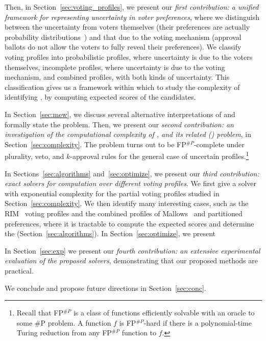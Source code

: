 Then, in Section~\ref{sec:voting_profiles}, we present our \emph{first contribution: a unified framework for representing uncertainty in voter preferences}, where we distinguish between the uncertainty from voters themselves (\eg their preferences are actually probability distributions~\cite{marden1995analyzing}) and that due to the voting mechanism (\eg approval ballots do not allow the voters to fully reveal their preferences). We classify voting profiles into probabilistic profiles, where uncertainty is due to the voters themselves, incomplete profiles, where uncertainty is due to the voting mechanism, and combined  profiles, with both kinds of uncertainty. This classification gives us a framework within which to study the complexity of identifying \mew, by computing expected scores of the candidates.

In Section~\ref{sec:mew}, we discuss several alternative interpretations of \mew and formally state the \mew problem.  Then, we present our \emph{second contribution: an investigation of the computational complexity of \mew, and its related \ESC (\esc) problem}, in Section~\ref{sec:complexity}. The \mew problem turns out to be FP$^{\#P}$-complete under plurality, veto, and $k$-approval rules for the general case of uncertain profiles.\footnote{Recall that FP$^{\#P}$ is a class of functions efficiently solvable with an oracle to some \#P problem. A function $f$ is FP$^{\#P}$-hard if there is a polynomial-time Turing reduction from any FP$^{\#P}$ function to $f$.}

In Sections~\ref{sec:algorithms} and~\ref{sec:optimize}, we present our \emph{third contribution:  exact solvers for \mew computation over different voting profiles}. We first give a solver with exponential complexity for the partial voting profiles studied in Section~\ref{sec:complexity}. We then identify many interesting cases, such as the RIM~\cite{Doignon2004} voting profiles and the combined profiles of Mallows~\cite{Mallows1957} and partitioned preferences, where it is tractable to compute the expected scores and determine the \mew (Section~\ref{sec:algorithms}). In Section~\ref{sec:optimize}, we present  

In Section~\ref{sec:exp} we present our \emph{fourth contribution: an extensive experimental evaluation of the proposed solvers}, demonstrating that our proposed methods are practical. 


We conclude and propose future directions in Section~\ref{sec:conc}.